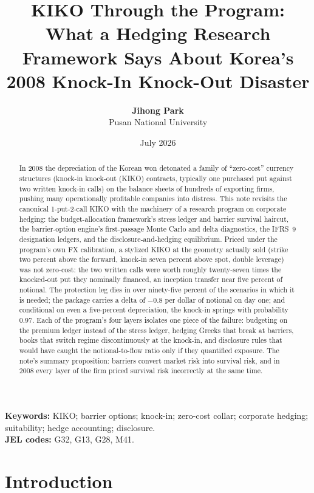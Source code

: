 \documentclass[11pt,a4paper]{article}
\title{\textbf{KIKO Through the Program:\\
What a Hedging Research Framework Says About Korea's\\
2008 Knock-In Knock-Out Disaster}}
\author{\textbf{Jihong Park} \\ Pusan National University}
\date{July 2026}
\begin{document}
\maketitle

\begin{abstract}
In 2008 the depreciation of the Korean won detonated a family of ``zero-cost'' currency structures (knock-in knock-out (KIKO) contracts, typically one purchased put against two written knock-in calls) on the balance sheets of hundreds of exporting firms, pushing many operationally profitable companies into distress. This note revisits the canonical 1-put-2-call KIKO with the machinery of a research program on corporate hedging: the budget-allocation framework's stress ledger and barrier survival haircut, the barrier-option engine's first-passage Monte Carlo and delta diagnostics, the IFRS~9 designation ledgers, and the disclosure-and-hedging equilibrium. Priced under the program's own FX calibration, a stylized KIKO at the geometry actually sold (strike two percent above the forward, knock-in seven percent above spot, double leverage) was not zero-cost: the two written calls were worth roughly twenty-seven times the knocked-out put they nominally financed, an inception transfer near five percent of notional. The protection leg dies in over ninety-five percent of the scenarios in which it is needed; the package carries a delta of $-0.8$ per dollar of notional on day one; and conditional on even a five-percent depreciation, the knock-in springs with probability $0.97$. Each of the program's four layers isolates one piece of the failure: budgeting on the premium ledger instead of the stress ledger, hedging Greeks that break at barriers, books that switch regime discontinuously at the knock-in, and disclosure rules that would have caught the notional-to-flow ratio only if they quantified exposure. The note's summary proposition: barriers convert market risk into survival risk, and in 2008 every layer of the firm priced survival risk incorrectly at the same time.
\end{abstract}

\noindent\textbf{Keywords:} KIKO; barrier options; knock-in; zero-cost collar; corporate hedging; suitability; hedge accounting; disclosure.\\
\textbf{JEL codes:} G32, G13, G28, M41.

\section{Introduction}
\label{sec:intro}
\end{document}
